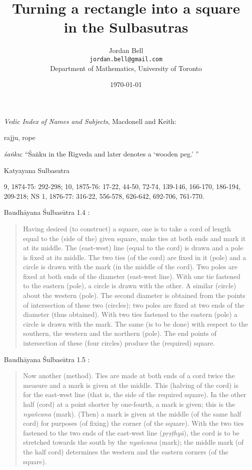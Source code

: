 \documentclass{article}
\begin{document}
\title{Turning a rectangle into a square in the Sulbasutras} 
\author{Jordan Bell\\ \texttt{jordan.bell@gmail.com}\\Department of Mathematics, University of Toronto}
\date{\today}

\maketitle

{\em Vedic Index of Names and Subjects}, Macdonell and Keith:

rajju, rope

{\em \'sa\.{n}ku}: ``\'Sa\.{n}ku in the Rigveda and later denotes a `wooden peg.' ''




Katyayana Sulbasutra \cite{khadilkar}

9, 1874-75: 292-298;
10, 1875-76: 17-22,
44-50,
72-74,
139-146,
166-170,
186-194,
209-218;
NS 1, 1876-77: 316-22,
556-578,
626-642,
692-706,
761-770.


Baudh\=ayana \'Sulbas\=utra 1.4 \cite[p.~77]{senbag}:

\begin{quote}
Having desired (to construct) a square, one is to take a cord of length equal 
to the (side of the) given square, make ties at both ends and mark it at its
middle. The (east-west) line (equal to the cord) is drawn and a pole is fixed
at its middle. The two ties (of the cord) are fixed in it (pole) and a circle is
drawn with the mark (in the middle of the cord). Two poles are fixed at both
ends of the diameter (east-west line). With one tie fastened to the eastern
(pole), a circle is drawn with the other. A similar (circle) about the western
(pole). The second diameter is obtained from the points of intersection of
these two (circles); two poles are fixed at two ends of the diameter (thus
obtained). With two ties fastened to the eastern (pole) a circle is drawn with
the mark. The same (is to be done) with respect to the southern, the western
and the northern (pole). The end points of intersection of these (four circles)
produce the (required) square.
\end{quote}

Baudh\=ayana \'Sulbas\=utra 1.5 \cite[p.~77]{senbag}:

\begin{quote}
Now another (method). Ties are made at both ends of a cord twice the
measure and a mark is given at the middle. This (halving of the cord) is for
the east-west line (that is, the side of the required square). In the other half
(cord) at a point shorter by one-fourth, a mark is given; this is the {\em nya\~ncana}
(mark). (Then) a mark is given at the middle (of the same half cord) for
purposes (of fixing) the corner (of the square). With the two ties fastened to
the two ends of the east-west line ({\em p\d{r}\d{s}\d{t}hy\=a}), the cord is to be stretched towards
the south by the {\em nya\~ncana} (mark); the middle mark (of the half cord) determines
the western and the eastern corners (of the square).
\end{quote}
\end{document}
